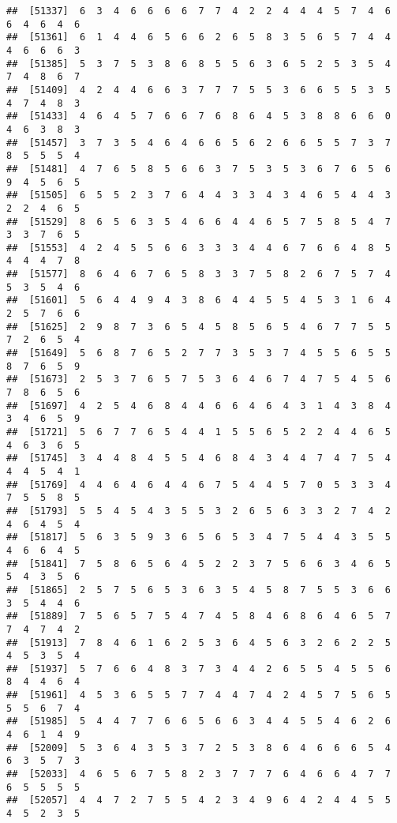\documentclass[
]{book}
\begin{document}
\begin{verbatim}
##  [51337]  6  3  4  6  6  6  6  7  7  4  2  2  4  4  4  5  7  4  6  6  4  6  4  6
##  [51361]  6  1  4  4  6  5  6  6  2  6  5  8  3  5  6  5  7  4  4  4  6  6  6  3
##  [51385]  5  3  7  5  3  8  6  8  5  5  6  3  6  5  2  5  3  5  4  7  4  8  6  7
##  [51409]  4  2  4  4  6  6  3  7  7  7  5  5  3  6  6  5  5  3  5  4  7  4  8  3
##  [51433]  4  6  4  5  7  6  6  7  6  8  6  4  5  3  8  8  6  6  0  4  6  3  8  3
##  [51457]  3  7  3  5  4  6  4  6  6  5  6  2  6  6  5  5  7  3  7  8  5  5  5  4
##  [51481]  4  7  6  5  8  5  6  6  3  7  5  3  5  3  6  7  6  5  6  9  4  5  6  5
##  [51505]  6  5  5  2  3  7  6  4  4  3  3  4  3  4  6  5  4  4  3  2  2  4  6  5
##  [51529]  8  6  5  6  3  5  4  6  6  4  4  6  5  7  5  8  5  4  7  3  3  7  6  5
##  [51553]  4  2  4  5  5  6  6  3  3  3  4  4  6  7  6  6  4  8  5  4  4  4  7  8
##  [51577]  8  6  4  6  7  6  5  8  3  3  7  5  8  2  6  7  5  7  4  5  3  5  4  6
##  [51601]  5  6  4  4  9  4  3  8  6  4  4  5  5  4  5  3  1  6  4  2  5  7  6  6
##  [51625]  2  9  8  7  3  6  5  4  5  8  5  6  5  4  6  7  7  5  5  7  2  6  5  4
##  [51649]  5  6  8  7  6  5  2  7  7  3  5  3  7  4  5  5  6  5  5  8  7  6  5  9
##  [51673]  2  5  3  7  6  5  7  5  3  6  4  6  7  4  7  5  4  5  6  7  8  6  5  6
##  [51697]  4  2  5  4  6  8  4  4  6  6  4  6  4  3  1  4  3  8  4  3  4  6  5  9
##  [51721]  5  6  7  7  6  5  4  4  1  5  5  6  5  2  2  4  4  6  5  4  6  3  6  5
##  [51745]  3  4  4  8  4  5  5  4  6  8  4  3  4  4  7  4  7  5  4  4  4  5  4  1
##  [51769]  4  4  6  4  6  4  4  6  7  5  4  4  5  7  0  5  3  3  4  7  5  5  8  5
##  [51793]  5  5  4  5  4  3  5  5  3  2  6  5  6  3  3  2  7  4  2  4  6  4  5  4
##  [51817]  5  6  3  5  9  3  6  5  6  5  3  4  7  5  4  4  3  5  5  4  6  6  4  5
##  [51841]  7  5  8  6  5  6  4  5  2  2  3  7  5  6  6  3  4  6  5  5  4  3  5  6
##  [51865]  2  5  7  5  6  5  3  6  3  5  4  5  8  7  5  5  3  6  6  3  5  4  4  6
##  [51889]  7  5  6  5  7  5  4  7  4  5  8  4  6  8  6  4  6  5  7  7  4  7  4  2
##  [51913]  7  8  4  6  1  6  2  5  3  6  4  5  6  3  2  6  2  2  5  4  5  3  5  4
##  [51937]  5  7  6  6  4  8  3  7  3  4  4  2  6  5  5  4  5  5  6  8  4  4  6  4
##  [51961]  4  5  3  6  5  5  7  7  4  4  7  4  2  4  5  7  5  6  5  5  5  6  7  4
##  [51985]  5  4  4  7  7  6  6  5  6  6  3  4  4  5  5  4  6  2  6  4  6  1  4  9
##  [52009]  5  3  6  4  3  5  3  7  2  5  3  8  6  4  6  6  6  5  4  6  3  5  7  3
##  [52033]  4  6  5  6  7  5  8  2  3  7  7  7  6  4  6  6  4  7  7  6  5  5  5  5
##  [52057]  4  4  7  2  7  5  5  4  2  3  4  9  6  4  2  4  4  5  5  4  5  2  3  5

\end{verbatim}
\end{document}
